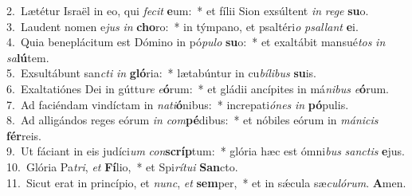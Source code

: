 {2.~}Lætétur Israël in eo, qui \textit{fe}\textit{cit} \textbf{e}um:~* et fílii Sion exsúltent \textit{in} \textit{re}\textit{ge} \textbf{su}o.\\
{3.~}Laudent nomen e\textit{jus} \textit{in} \textbf{cho}ro:~* in týmpano, et psaltéri\textit{o} \textit{psal}\textit{lant} \textbf{e}i.\\
{4.~}Quia beneplácitum est Dómino in pó\textit{pu}\textit{lo} \textbf{su}o:~* et exaltábit mansué\textit{tos} \textit{in} \textit{sa}\textbf{lú}tem.\\
{5.~}Exsultábunt san\textit{cti} \textit{in} \textbf{gló}ria:~* lætabúntur in cu\textit{bí}\textit{li}\textit{bus} \textbf{su}is.\\
{6.~}Exaltatiónes Dei in gúttu\textit{re} \textit{e}\textbf{ó}rum:~* et gládii ancípites in má\textit{ni}\textit{bus} \textit{e}\textbf{ó}rum.\\
{7.~}Ad faciéndam vindíctam in \textit{na}\textit{ti}\textbf{ó}nibus:~* increpati\textit{ó}\textit{nes} \textit{in} \textbf{pó}pulis.\\
{8.~}Ad alligándos reges eórum \textit{in} \textit{com}\textbf{pé}dibus:~* et nóbiles eórum in \textit{má}\textit{ni}\textit{cis} \textbf{fér}reis.\\
{9.~}Ut fáciant in eis judíci\textit{um} \textit{con}\textbf{scríp}tum:~* glória hæc est ómni\textit{bus} \textit{san}\textit{ctis} \textbf{e}jus.\\
{10.~}Glória Pa\textit{tri}, \textit{et} \textbf{Fí}lio,~* et Spi\textit{rí}\textit{tu}\textit{i} \textbf{San}cto.\\
{11.~}Sicut erat in princípio, et \textit{nunc}, \textit{et} \textbf{sem}per,~* et in sǽcula sæ\textit{cu}\textit{ló}\textit{rum}. \textbf{A}men.\\
